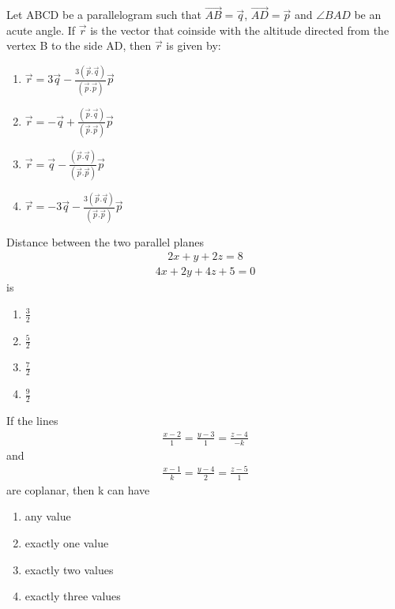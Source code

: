 \item Let ABCD be a parallelogram such that $\overrightarrow{AB}=\overrightarrow{q}$, $\overrightarrow{AD}=\overrightarrow{p}$ and $\angle BAD$ be an acute angle. If $\overrightarrow{r}$ is the vector that coinside with the altitude directed from the vertex B to the side AD, then $\overrightarrow{r}$ is given by:
\begin{enumerate}
\item $\overrightarrow{r}=3\overrightarrow{q}-\frac{3(\overrightarrow{p}.\overrightarrow{q})}{(\overrightarrow{p}.\overrightarrow{p})}\overrightarrow{p}$
\item $\overrightarrow{r}=-\overrightarrow{q}+\frac{(\overrightarrow{p}.\overrightarrow{q})}{(\overrightarrow{p}.\overrightarrow{p})}\overrightarrow{p}$
\item $\overrightarrow{r}=\overrightarrow{q}-\frac{(\overrightarrow{p}.\overrightarrow{q})}{(\overrightarrow{p}.\overrightarrow{p})}\overrightarrow{p}$
\item $\overrightarrow{r}=-3\overrightarrow{q}-\frac{3(\overrightarrow{p}.\overrightarrow{q})}{(\overrightarrow{p}.\overrightarrow{p})}\overrightarrow{p}$
\end{enumerate}

\item Distance between the two parallel planes
\begin{align*}
2x+y+2z=8
\end{align*}
\begin{align*}
4x+2y+4z+5=0
\end{align*}
is
\begin{enumerate}
\item $\frac{3}{2}$
\item $\frac{5}{2}$
\item $\frac{7}{2}$
\item $\frac{9}{2}$
\end{enumerate}

\item If the lines 
\begin{align*}
\frac{x-2}{1} = \frac{y-3}{1} = \frac{z-4}{-k}
\end{align*}
and 
\begin{align*}
\frac{x-1}{k} = \frac{y-4}{2} = \frac{z-5}{1}
\end{align*}
are coplanar, then k can have
\begin{enumerate}
\item any value
\item exactly one value
\item exactly two values
\item exactly three values
\end{enumerate}


